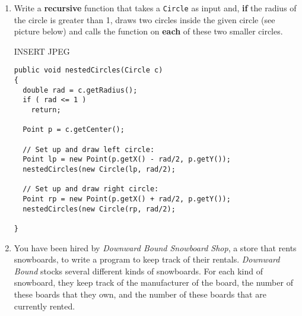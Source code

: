\begin{enumerate}
\begin{verbatim}
  public double distance(Point a, Point b)
  {
    return ( Math.sqrt( 
        (a.getX() - b.getX())*(a.getX() - b.getX()) +
        (a.getY() - b.getY())*(a.getY() - b.getY())));
  }

  public Point midpoint(Point a, Point b)
  {
    double x = (a.getX() + b.getX())/2;
    double y = (a.getY() + b.getY())/2;
    return new Point(x,y);
  }
\end{verbatim}

 	\begin{enumerate}
	    \item What is the output of 
\begin{verbatim}
   again(new Point(0,0), new Point(1,-1), true)
\end{verbatim}
        {\bf Output:}
        
    INSERT JPEG 
    
	    \item What is the output of 
\begin{verbatim}
    again(new Point(0,2), new Point(4,0), false)
\end{verbatim}
        {\bf Output:}
        
        INSERT JPEG
        
	\end{enumerate}

    \item Write a {\bf recursive} function that takes a {\tt Circle} as
	input and, {\bf if} the radius of the circle is greater than 1, 
	draws two circles inside the given circle (see picture below)
	and calls the function on {\bf each} of these two smaller circles.


     INSERT JPEG
     
\begin{verbatim}
public void nestedCircles(Circle c)
{
  double rad = c.getRadius();
  if ( rad <= 1 )
    return;
    
  Point p = c.getCenter();
  
  // Set up and draw left circle:
  Point lp = new Point(p.getX() - rad/2, p.getY());
  nestedCircles(new Circle(lp, rad/2);
  
  // Set up and draw right circle:
  Point rp = new Point(p.getX() + rad/2, p.getY());
  nestedCircles(new Circle(rp, rad/2);
  
}
\end{verbatim}

	\item You have been hired by {\it Downward Bound Snowboard Shop},
		a store that rents snowboards, to write a program to
		keep track of their rentals.  {\it Downward Bound} 
		stocks several different kinds of snowboards.  For each 
		kind of snowboard, they keep track of the manufacturer of 
		the board, the number of these boards that they 
		own, and the number of these boards that are currently
		rented.  


\end{enumerate}
